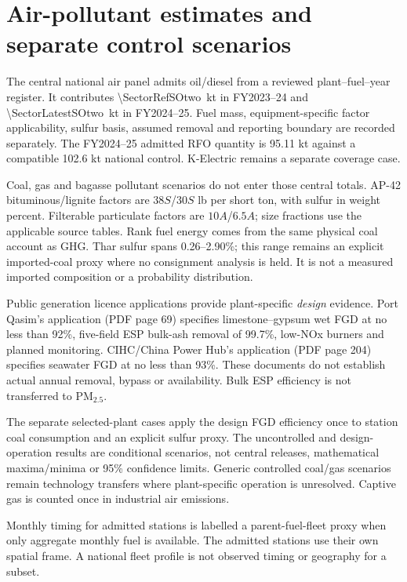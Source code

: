 \section{Air-pollutant estimates and separate control scenarios}
\label{sec:air}
The central national air panel admits oil/diesel \SOtwo{} from a reviewed plant--fuel--year register. It contributes \SI{\SectorRefSOtwo}{\kilo\tonne} in FY2023--24 and \SI{\SectorLatestSOtwo}{\kilo\tonne} in FY2024--25. Fuel mass, equipment-specific factor applicability, sulfur basis, assumed removal and reporting boundary are recorded separately. The FY2024--25 admitted RFO quantity is 95.11 kt against a compatible 102.6 kt national control. K-Electric remains a separate coverage case.

Coal, gas and bagasse pollutant scenarios do not enter those central totals. AP-42 bituminous/lignite \SOtwo{} factors are $38S$/$30S$ lb per short ton, with sulfur in weight percent. Filterable particulate factors are $10A$/$6.5A$; size fractions use the applicable source tables. Rank fuel energy comes from the same physical coal account as GHG. Thar sulfur spans 0.26--2.90\%; this range remains an explicit imported-coal proxy where no consignment analysis is held. It is not a measured imported composition or a probability distribution.

\begin{table}[htbp]\centering\small

\caption{Central power air admission. NE means no central estimate; separate screening cases do not fill these cells.}\label{tab:air}
\end{table}

Public generation licence applications provide plant-specific \emph{design} evidence. Port Qasim's application (PDF page 69) specifies limestone--gypsum wet FGD at no less than 92\%, five-field ESP bulk-ash removal of 99.7\%, low-NOx burners and planned monitoring. CIHC/China Power Hub's application (PDF page 204) specifies seawater FGD at no less than 93\%. These documents do not establish actual annual removal, bypass or availability. Bulk ESP efficiency is not transferred to PM$_{2.5}$.

The separate selected-plant \SOtwo{} cases apply the design FGD efficiency once to station coal consumption and an explicit sulfur proxy. The uncontrolled and design-operation results are conditional scenarios, not central releases, mathematical maxima/minima or 95\% confidence limits. Generic controlled coal/gas scenarios remain technology transfers where plant-specific operation is unresolved. Captive gas is counted once in industrial air emissions.

Monthly timing for admitted stations is labelled a parent-fuel-fleet proxy when only aggregate monthly fuel is available. The admitted stations use their own spatial frame. A national fleet profile is not observed timing or geography for a subset.
